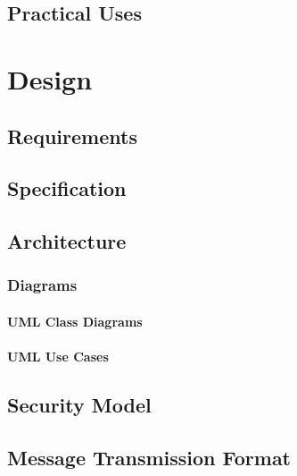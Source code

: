 \documentclass[a4paper,12pt]{report}
\begin{document}


\section{Practical Uses}



\chapter{Design}

\section{Requirements}



\section{Specification}



\section{Architecture}

\subsection{Diagrams}

\subsubsection{UML Class Diagrams}

\subsubsection{UML Use Cases}



\section{Security Model}

\section{Message Transmission Format}


\end{document}

